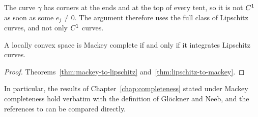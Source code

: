 \begin{remark}
  The curve $\gamma$ has corners at the ends and at the top of every tent, so it is not
  $C^{1}$ as soon as some $e_j \neq 0$. The argument therefore uses the full class of Lipschitz
  curves, and not only $C^{1}$ curves.
\end{remark}

\begin{corollary}
  \label{cor:mackey-iff}
  \leanok
  A locally convex space is Mackey complete if and only if it integrates Lipschitz curves.
\end{corollary}

\begin{proof}
  \leanok
  Theorems~\ref{thm:mackey-to-lipschitz} and~\ref{thm:lipschitz-to-mackey}.
\end{proof}

In particular, the results of Chapter~\ref{chap:completeness} stated under Mackey completeness
hold verbatim with the definition of Glöckner and Neeb, and the references to \cite{GN26} can be
compared directly.

